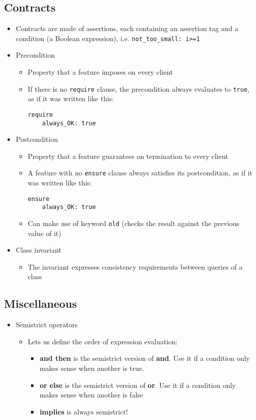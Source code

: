 \documentclass[a4paper]{article}
\newcommand{\inline}[1]{\lstinline!#1!}%
\begin{document}
\subsection{Contracts}
\begin{itemize}
\item Contracts are made of assertions, each containing an assertion tag and a condition (a Boolean expression), i.e. \inline{not_too_small: i>=1}
\item Precondition
\begin{itemize}
\item Property that a feature imposes on every client
\item If there is no \inline{require} clause, the precondition always evaluates to \inline{true}, as if it was written like this:
\begin{lstlisting}
require
	always_OK: true
\end{lstlisting}
\end{itemize}
\item Postcondition
\begin{itemize}
\item Property that a feature guarantees on termination to every client
\item A feature with no \inline{ensure} clause always satisfies its postcondition, as if it was written like this:
\begin{lstlisting}
ensure
	always_OK: true
\end{lstlisting}
\item Can make use of keyword \inline{old} (checks the result against the previous value of it)
\end{itemize}
\item Class invariant
\begin{itemize}
\item The invariant expresses consistency requirements between queries of a class
\end{itemize}
\end{itemize}

\subsection{Miscellaneous}
\begin{itemize}
\item Semistrict operators
\begin{itemize}
\item Lets us define the order of expression evaluation:
\begin{itemize}
\item \textbf{and then} is the semistrict version of \textbf{and}. Use it if a condition only makes sense when another is true.
\item \textbf{or else} is the semistrict version of \textbf{or}. Use it if a condition only makes sense when another is false
\item\textbf{implies} is always semistrict!
\end{itemize}
\end{itemize}
\end{itemize}
\end{document}
